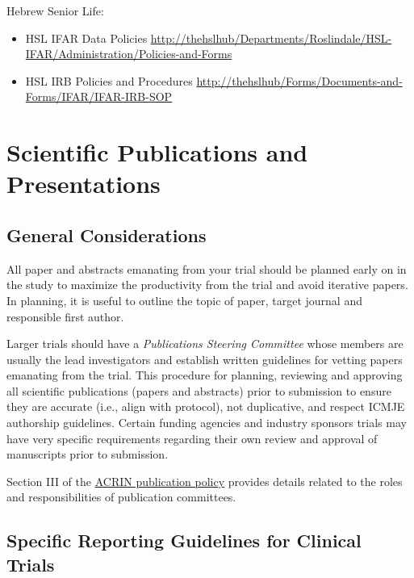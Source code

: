 \documentclass[]{book}
\providecommand{\tightlist}{%
  \setlength{\itemsep}{0pt}\setlength{\parskip}{0pt}}
\begin{document}
Hebrew Senior Life:

\begin{itemize}
\tightlist
\item
  HSL IFAR Data Policies
  \url{http://thehslhub/Departments/Roslindale/HSL-IFAR/Administration/Policies-and-Forms}
\item
  HSL IRB Policies and Procedures
  \url{http://thehslhub/Forms/Documents-and-Forms/IFAR/IFAR-IRB-SOP}
\end{itemize}

\section{Scientific Publications and
Presentations}\label{scientific-publications-and-presentations}

\subsection{General Considerations}\label{general-considerations-1}

All paper and abstracts emanating from your trial should be planned
early on in the study to maximize the productivity from the trial and
avoid iterative papers. In planning, it is useful to outline the topic
of paper, target journal and responsible first author.

Larger trials should have a \emph{Publications Steering Committee} whose
members are usually the lead investigators and establish written
guidelines for vetting papers emanating from the trial. This procedure
for planning, reviewing and approving all scientific publications
(papers and abstracts) prior to submission to ensure they are accurate
(i.e., align with protocol), not duplicative, and respect ICMJE
authorship guidelines. Certain funding agencies and industry sponsors
trials may have very specific requirements regarding their own review
and approval of manuscripts prior to submission.

Section III of the
\href{https://www.acrin.org/RESEARCHERS/POLICIES/PUBLICATIONSPOLICY/PUBLICATIONSPOLICYDOCUMENT.aspx}{ACRIN
publication policy} provides details related to the roles and
responsibilities of publication committees.

\subsection{Specific Reporting Guidelines for Clinical
Trials}\label{specific-reporting-guidelines-for-clinical-trials}
\end{document}
